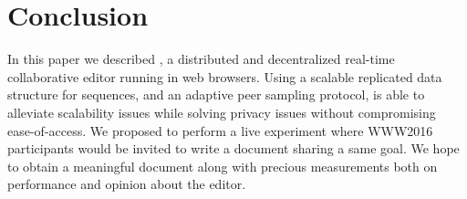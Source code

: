 
\section{Conclusion}
\label{sec:conclusion}

In this paper we described \CRATE, a distributed and decentralized real-time
collaborative editor running in web browsers. Using a scalable replicated data
structure for sequences, and an adaptive peer sampling protocol, \CRATE is able
to alleviate scalability issues while solving privacy issues without
compromising ease-of-access. We proposed to perform a live experiment where
WWW2016 participants would be invited to write a document sharing a same
goal. We hope to obtain a meaningful document along with precious measurements
both on performance and opinion about the editor.

